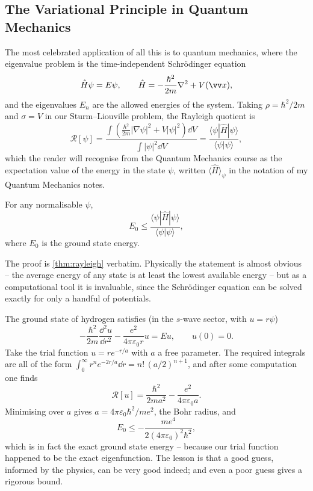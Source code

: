\documentclass[a4paper]{scrartcl}
\begin{document}
\subsection{The Variational Principle in Quantum Mechanics}

The most celebrated application of all this is to quantum mechanics, where the eigenvalue problem is the time-independent Schr\"odinger equation
$$
\hat H \psi = E\psi, \qquad \hat H = -\frac{\hbar^2}{2m}\nabla^2 + V(\vv x),
$$
and the eigenvalues $E_n$ are the allowed energies of the system. Taking $\rho = \hbar^2/2m$ and $\sigma = V$ in our Sturm--Liouville problem, the Rayleigh quotient is
$$
\mathcal{R}[\psi] = \frac{\displaystyle\int\left(\frac{\hbar^2}{2m}|\nabla \psi|^2 + V|\psi|^2\right)\dd V}{\displaystyle\int |\psi|^2 \dd V} = \frac{\langle \psi | \hat H | \psi\rangle}{\langle \psi|\psi\rangle},
$$
which the reader will recognise from the Quantum Mechanics course as the expectation value of the energy in the state $\psi$, written $\langle \hat H\rangle_\psi$ in the notation of my Quantum Mechanics notes.

\begin{theorem}
	For any normalisable $\psi$,
	$$
	E_0 \leq \frac{\langle\psi|\hat H|\psi\rangle}{\langle \psi|\psi\rangle},
	$$
	where $E_0$ is the ground state energy.
\end{theorem}

The proof is \autoref{thm:rayleigh} verbatim. Physically the statement is almost obvious -- the average energy of any state is at least the lowest available energy -- but as a computational tool it is invaluable, since the Schr\"odinger equation can be solved exactly for only a handful of potentials.

\begin{example}
	The ground state of hydrogen satisfies (in the $s$-wave sector, with $u = r\psi$)
	$$
	-\frac{\hbar^2}{2m}\frac{\dd^2 u}{\dd r^2} - \frac{e^2}{4\pi\varepsilon_0 r}u = Eu, \qquad u(0) = 0.
	$$
	Take the trial function $u = r e^{-r/a}$ with $a$ a free parameter. The required integrals are all of the form $\int_0^\infty r^n e^{-2r/a}\dd r = n!\,(a/2)^{n+1}$, and after some computation one finds
	$$
	\mathcal{R}[u] = \frac{\hbar^2}{2ma^2} - \frac{e^2}{4\pi\varepsilon_0 a}.
	$$
	Minimising over $a$ gives $a = 4\pi\varepsilon_0\hbar^2/me^2$, the Bohr radius, and
	$$
	E_0 \leq -\frac{m e^4}{2(4\pi\varepsilon_0)^2\hbar^2},
	$$
	which is in fact the exact ground state energy -- because our trial function happened to be the exact eigenfunction. The lesson is that a good guess, informed by the physics, can be very good indeed; and even a poor guess gives a rigorous bound.
\end{example}
\end{document}
